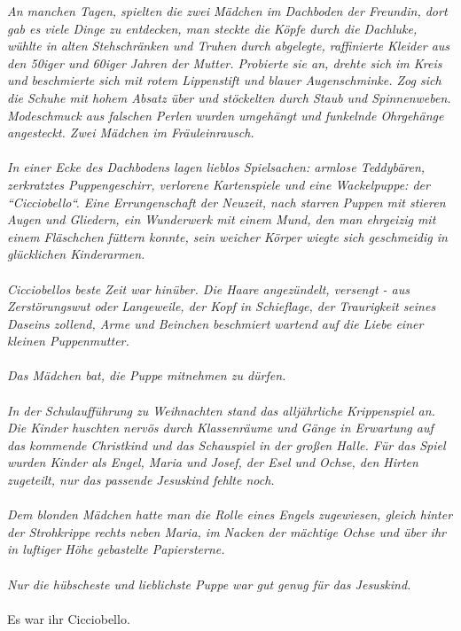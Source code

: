 \textit{An manchen Tagen, spielten die zwei Mädchen im Dachboden der Freundin, dort gab es viele Dinge zu entdecken, man steckte die Köpfe durch die Dachluke, wühlte in alten Stehschränken und Truhen durch abgelegte, raffinierte Kleider aus den 50iger und 60iger Jahren der Mutter. Probierte sie an, drehte sich im Kreis und beschmierte sich mit rotem Lippenstift und blauer Augenschminke. Zog sich die Schuhe mit hohem Absatz über und stöckelten durch Staub und Spinnenweben. Modeschmuck aus falschen Perlen wurden umgehängt und funkelnde Ohrgehänge angesteckt. Zwei Mädchen im Fräuleinrausch.\\\\
In einer Ecke des Dachbodens lagen lieblos Spielsachen: armlose Teddybären, zerkratztes Puppengeschirr, verlorene Kartenspiele und eine Wackelpuppe: der  “Cicciobello“. Eine Errungenschaft der Neuzeit, nach starren Puppen mit stieren Augen und Gliedern, ein Wunderwerk mit einem Mund, den man ehrgeizig mit einem Fläschchen füttern konnte, sein weicher Körper wiegte sich geschmeidig in glücklichen Kinderarmen.\\\\
Cicciobellos beste Zeit war hinüber. Die Haare angezündelt, versengt - aus Zerstörungswut oder Langeweile, der Kopf in Schieflage, der Traurigkeit seines Daseins zollend, Arme und Beinchen beschmiert wartend auf die Liebe einer kleinen Puppenmutter. \\\\
Das Mädchen bat, die Puppe mitnehmen zu dürfen.\\\\
In der Schulaufführung zu Weihnachten stand das alljährliche Krippenspiel an. Die Kinder huschten nervös durch Klassenräume und Gänge in Erwartung auf das kommende Christkind und das Schauspiel in der großen Halle. Für das Spiel wurden Kinder als Engel, Maria und Josef, der Esel und Ochse, den Hirten zugeteilt, nur das passende Jesuskind fehlte noch.\\\\
Dem blonden Mädchen hatte man die Rolle eines Engels zugewiesen, gleich hinter der Strohkrippe rechts neben Maria, im Nacken der mächtige Ochse und über ihr in luftiger Höhe gebastelte Papiersterne.\\\\
Nur die hübscheste und lieblichste Puppe war gut genug für das Jesuskind.}\\\\
Es war ihr Cicciobello.\\\\
